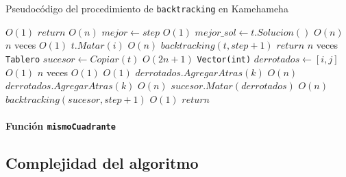   \begin{algorithm}[H]
  \begin{algorithmic}
  \label{algo:backtracking}
  \caption{Pseudocódigo del procedimiento de \texttt{backtracking} en Kamehameha}
    \Comment $O(1)$
      \State $return$
    \EndIf
    \Comment $O(n)$
      \State $mejor \gets step$
      \Comment $O(1)$
      \State $mejor\_sol \gets t.Solucion()$
      \Comment $O(n)$
    \Else
      \For {$i \in [0,..., n),$ $t.EstaVivo?(i)$}
      \Comment $n$ veces
        \Comment $O(1)$
          \State $t.Matar(i)$
          \Comment $O(n)$
          \State $backtracking(t, step+1)$
          \State $return$
        \EndIf
        \For {$j \in [0,..., n),$ $j \neq i \land t.EstaVivo?(j)$}
          \Comment $n$ veces
          \State \texttt{Tablero} $sucesor \gets Copiar(t)$
          \Comment $O(2n+1)$
          \State \texttt{Vector(int)} $derrotados \gets [i, j]$
          \Comment $O(1)$ 
          \For {$k \in [0,..., n),$ $k \neq i \land k \neq j \land t.EstaVivo?(k)$}
          \Comment $n$ veces
            \Comment $O(1)$
              \Comment $O(1)$
                \State $derrotados.AgregarAtras(k)$
                \Comment $O(n)$
              \EndIf
            \Else 
              \normalsize
                \State $derrotados.AgregarAtras(k)$
                \Comment $O(n)$
              \EndIf
            \EndIf
          \EndFor
          \State $sucesor.Matar(derrotados)$
          \Comment $O(n)$
          \State $backtracking(sucesor, step+1)$
            \Comment $O(1)$
            \State $return$
          \EndIf
        \EndFor
      \EndFor
    \EndIf
    \EndProcedure
  \end{algorithmic}
  \end{algorithm}

  \paragraph{Función \texttt{mismoCuadrante}}

\subsection{Complejidad del algoritmo}
